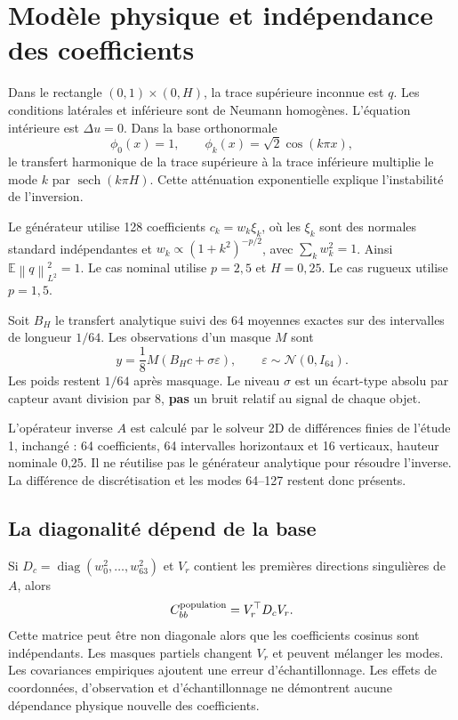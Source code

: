 \documentclass[11pt,a4paper]{article}
\newcommand{\norm}[1]{\left\lVert#1\right\rVert}
\begin{document}
\newpage
\section{Modèle physique et indépendance des coefficients}\label{model}
Dans le rectangle $(0,1)\times(0,H)$, la trace supérieure inconnue est $q$. Les conditions latérales et inférieure sont de Neumann homogènes. L'équation intérieure est $\Delta u=0$. Dans la base orthonormale
\[
 \phi_0(x)=1,\qquad \phi_k(x)=\sqrt2\cos(k\pi x),
\]
le transfert harmonique de la trace supérieure à la trace inférieure multiplie le mode $k$ par $\operatorname{sech}(k\pi H)$. Cette atténuation exponentielle explique l'instabilité de l'inversion.

Le générateur utilise 128 coefficients $c_k=w_k\xi_k$, où les $\xi_k$ sont des normales standard indépendantes et $w_k\propto(1+k^2)^{-p/2}$, avec $\sum_k w_k^2=1$. Ainsi $\mathbb E\norm{q}_{L^2}^2=1$. Le cas nominal utilise $p=2,5$ et $H=0,25$. Le cas rugueux utilise $p=1,5$.

Soit $B_H$ le transfert analytique suivi des 64 moyennes exactes sur des intervalles de longueur $1/64$. Les observations d'un masque $M$ sont
\[
 y=\frac{1}{8}M(B_Hc+\sigma\varepsilon),\qquad
 \varepsilon\sim\mathcal N(0,I_{64}).
\]
Les poids restent $1/64$ après masquage. Le niveau $\sigma$ est un écart-type absolu par capteur avant division par 8, \textbf{pas} un bruit relatif au signal de chaque objet.

L'opérateur inverse $A$ est calculé par le solveur 2D de différences finies de l'étude 1, inchangé : 64 coefficients, 64 intervalles horizontaux et 16 verticaux, hauteur nominale 0,25. Il ne réutilise pas le générateur analytique pour résoudre l'inverse. La différence de discrétisation et les modes 64--127 restent donc présents.

\subsection{La diagonalité dépend de la base}
Si $D_c=\operatorname{diag}(w_0^2,\ldots,w_{63}^2)$ et $V_r$ contient les premières directions singulières de $A$, alors
\[
 C_{bb}^{\rm population}=V_r^\top D_c V_r.
\]
Cette matrice peut être non diagonale alors que les coefficients cosinus sont indépendants. Les masques partiels changent $V_r$ et peuvent mélanger les modes. Les covariances empiriques ajoutent une erreur d'échantillonnage. Les effets de coordonnées, d'observation et d'échantillonnage ne démontrent aucune dépendance physique nouvelle des coefficients.
\end{document}
